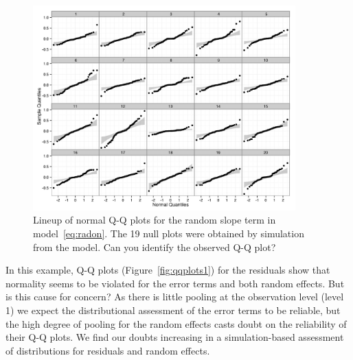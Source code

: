 \documentclass{article} %
\newcommand{\al}[1]{{\color{red} #1}}
\begin{document}
\begin{figure}[htb]
	\centering
	\includegraphics[width=0.9\textwidth]{test.jpeg}%
	\caption{\label{fig:lineup} Lineup of normal Q-Q plots for the random slope term in model~\eqref{eq:radon}. The 19 null plots were obtained by simulation from the model. Can you identify the observed Q-Q plot? }
\end{figure}


In this example, Q-Q plots (Figure~\ref{fig:qqplots1}) for the residuals show that normality 
seems to be violated for the error terms and both random effects. But is this cause for concern?
\al{As} there is little pooling at the observation level \al{(level 1)} we expect the distributional assessment of the error terms to be reliable, but  the high degree of pooling  for the random effects  casts doubt on the reliability of their Q-Q plots. 
 We find our doubts increasing in a simulation-based assessment of distributions for residuals and random effects.
\end{document}
